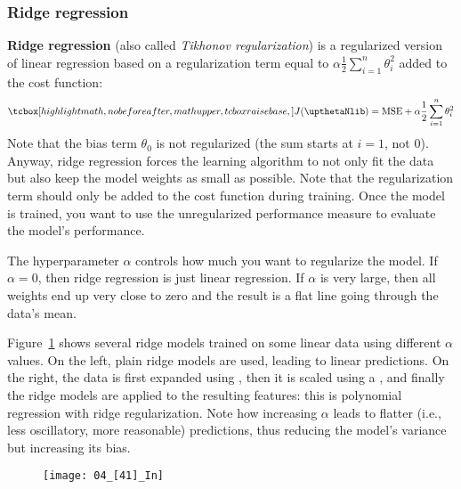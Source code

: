 \subsubsection{Ridge regression}
\textbf{Ridge regression} (also called \emph{Tikhonov regularization}) is a regularized version of linear regression based on a regularization term equal to $\alpha\frac{1}{2}\sum_{i=1}^n\theta_i^2$ added to the cost function:
\begin{equation}
\tcbhighmath{J(\boldtheta)=\text{MSE}+\alpha\frac{1}{2}\sum_{i=1}^n\theta_i^2}
\end{equation}
Note that the bias term $\theta_0$ is not regularized (the sum starts at $i=1$, not $0$). Anyway, ridge regression forces the learning algorithm to not only fit the data but also keep the model weights as small as possible. Note that the regularization term should only be added to the cost function during training. Once the model is trained, you want to use the unregularized performance measure to evaluate the model's performance.

The hyperparameter $\alpha$ controls how much you want to regularize the model. If $\alpha=0$, then ridge regression is just linear regression. If $\alpha$ is very large, then all weights end up very close to zero and the result is a flat line going through the data's mean.

Figure~\ref{04_[41]_In} shows several ridge models trained on some linear data using different $\alpha$ values. On the left, plain ridge models are used, leading to linear predictions. On the right, the data is first expanded using , then it is scaled using a , and finally the ridge models are applied to the resulting features: this is polynomial regression with ridge regularization. Note how increasing $\alpha$ leads to flatter (i.e., less oscillatory, more reasonable) predictions, thus reducing the model's variance but increasing its bias.
\begin{figure}[h!t]
\centering
\texttt{[image: 04\_[41]\_In]}
\caption{}\label{04_[41]_In}
\end{figure}

